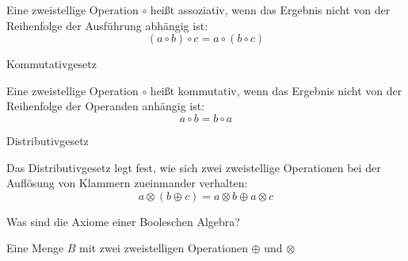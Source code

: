 \documentclass
[
  draft    = true,
  fontsize = 11pt,
  parskip  = half-,
  BCOR     = 0pt,
  DIV      = 11,
  ngerman,
  dvipsnames
]
{scrartcl}
\begin{document}
\begin{mytemize}
\begin{mytemize}
                \begin{achim}
                  \begin{mytemize}
                    \item Eine zweistellige Operation $\circ$ heißt assoziativ, wenn das Ergebnis
                          nicht von der Reihenfolge der Ausführung abhängig ist:
                          \begin{equation*}
                            (a\circ b)\circ c=a\circ(b\circ c)
                          \end{equation*}
                  \end{mytemize}
                \end{achim}
          \item Kommutativgesetz
                \begin{achim}
                  \begin{mytemize}
                    \item Eine zweistellige Operation $\circ$ heißt kommutativ, wenn das Ergebnis
                          nicht von der Reihenfolge der Operanden anhängig ist:
                          \begin{equation*}
                            a\circ b=b\circ a
                          \end{equation*}
                  \end{mytemize}
                \end{achim}
          \item Distributivgesetz
                \begin{achim}
                  \begin{mytemize}
                    \item Das Distributivgesetz legt fest, wie sich zwei zweistellige Operationen
                          bei der Auflösung von Klammern zueinmander verhalten:
                          \begin{equation*}
                            a\otimes(b\oplus c)=a\otimes b\oplus a\otimes c
                          \end{equation*}
                  \end{mytemize}
                \end{achim}
        \end{mytemize}
  \item Was sind die Axiome einer Booleschen Algebra?
        \begin{achim}
          Eine Menge $B$ mit zwei zweistelligen Operationen $\oplus$ und $\otimes$

\end{achim}
\end{mytemize}
\end{document}
